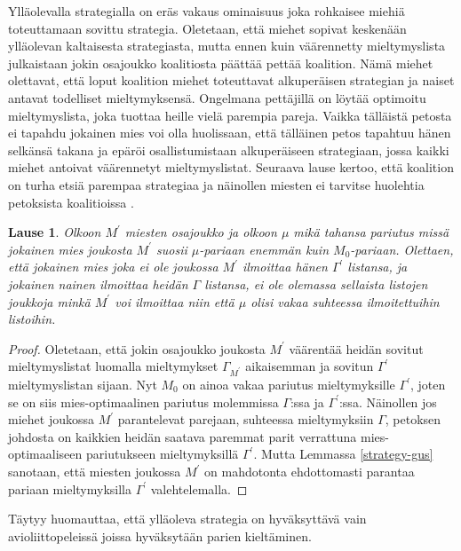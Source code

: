 \documentclass[finnish]{tktltiki2}
\newtheorem{lau}{Lause}
\theoremstyle{definition}
\theoremstyle{remark}
\begin{document}
Ylläolevalla strategialla on eräs vakaus ominaisuus joka rohkaisee miehiä toteuttamaan sovittu strategia. Oletetaan, että miehet sopivat keskenään ylläolevan kaltaisesta strategiasta, mutta ennen kuin väärennetty mieltymyslista julkaistaan jokin osajoukko koalitiosta päättää pettää koalition. Nämä miehet olettavat, että loput koalition miehet toteuttavat alkuperäisen strategian ja naiset antavat todelliset mieltymyksensä. Ongelmana pettäjillä on löytää optimoitu mieltymyslista, joka tuottaa heille vielä parempia pareja. Vaikka tälläistä petosta ei tapahdu jokainen mies voi olla huolissaan, että tälläinen petos tapahtuu hänen selkänsä takana ja epäröi osallistumistaan alkuperäiseen strategiaan, jossa kaikki miehet antoivat väärennetyt mieltymyslistat. Seuraava lause kertoo, että koalition on turha etsiä parempaa strategiaa ja näinollen miesten ei tarvitse huolehtia petoksista koalitioissa \cite{gusfield1989stable}.

\begin{lau}\cite[p, 58]{gusfield1989stable}
	Olkoon $M^{'}$ miesten osajoukko ja olkoon $\mu$ mikä tahansa pariutus missä jokainen mies joukosta $M^{'}$ suosii $\mu$-pariaan enemmän kuin $M_0$-pariaan. Olettaen, että jokainen mies joka ei ole joukossa $M^{'}$ ilmoittaa hänen $\Gamma^{'}$ listansa, ja jokainen nainen ilmoittaa heidän $\Gamma$ listansa, ei ole olemassa sellaista listojen joukkoja minkä $M^{'}$ voi ilmoittaa niin että $\mu$ olisi vakaa suhteessa ilmoitettuihin listoihin.
\end{lau}

\begin{proof}
	Oletetaan, että jokin osajoukko joukosta $M^{'}$ väärentää heidän sovitut mieltymyslistat luomalla mieltymykset $\Gamma_{M^{'}}$ aikaisemman ja sovitun $\Gamma^{'}$ mieltymyslistan sijaan. Nyt $M_0$ on ainoa vakaa pariutus mieltymyksille $\Gamma^{'}$, joten se on siis mies-optimaalinen pariutus molemmissa $\Gamma$:ssa ja $\Gamma^{'}$:ssa. Näinollen jos miehet joukossa $M^{'}$ parantelevat parejaan, suhteessa mieltymyksiin $\Gamma$, petoksen johdosta on kaikkien heidän saatava paremmat parit verrattuna mies-optimaaliseen pariutukseen mieltymyksillä $\Gamma^{'}$. Mutta Lemmassa \ref{strategy-gus} sanotaan, että miesten joukossa $M^{'}$ on mahdotonta ehdottomasti parantaa pariaan mieltymyksilla $\Gamma^{'}$ valehtelemalla.
\end{proof}

Täytyy huomauttaa, että ylläoleva strategia on hyväksyttävä vain avioliittopeleissä joissa hyväksytään parien kieltäminen.


%
%
% 
%



\end{document}
